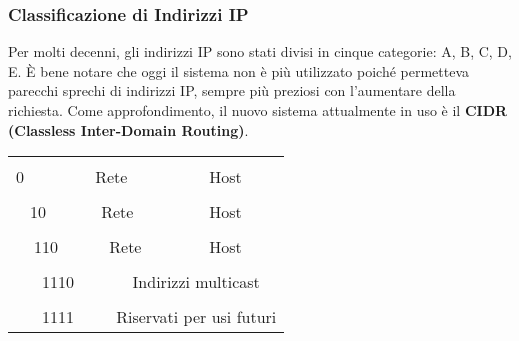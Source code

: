         \subsubsection*{Classificazione di Indirizzi IP}
            Per molti decenni, gli indirizzi IP sono stati divisi in cinque categorie: A, B, C, D, E.
            È bene notare che oggi il sistema non è più utilizzato poiché permetteva parecchi sprechi di
            indirizzi IP, sempre più preziosi con l’aumentare della richiesta. Come approfondimento, il
            nuovo sistema attualmente in uso è il \textbf{CIDR (Classless Inter-Domain Routing)}.\\
            
            
            \begin{tabular}{|l|l|l|l|l|l|l|l|l|l|l|l|l|l|l|l|l|l|l|l|l|l|l|l|l|l|l|l|l|l|l|l|}
                \hline
                & & & & & & & & & & & & & & & & & & & & & & & & & & & & & & & \\
                \hline
                \multicolumn{32}{l}{} \\
                \hline
                0 & \multicolumn{7}{|c|}{Rete} & \multicolumn{24}{|c|}{Host} \\
                \hline
                \multicolumn{32}{l}{} \\
                \hline
                \multicolumn{2}{|c|}{10} & \multicolumn{14}{|c|}{Rete} & \multicolumn{16}{|c|}{Host} \\
                \hline
                \multicolumn{32}{l}{} \\
                \hline
                \multicolumn{3}{|c|}{110} & \multicolumn{21}{|c|}{Rete} & \multicolumn{8}{|c|}{Host} \\
                \hline
                \multicolumn{32}{l}{} \\
                \hline
                \multicolumn{4}{|c|}{1110} & \multicolumn{28}{|c|}{Indirizzi multicast} \\
                \hline
                \multicolumn{32}{l}{} \\
                \hline
                \multicolumn{4}{|c|}{1111} & \multicolumn{28}{|c|}{Riservati per usi futuri} \\
                \hline
            \end{tabular}\\
            
